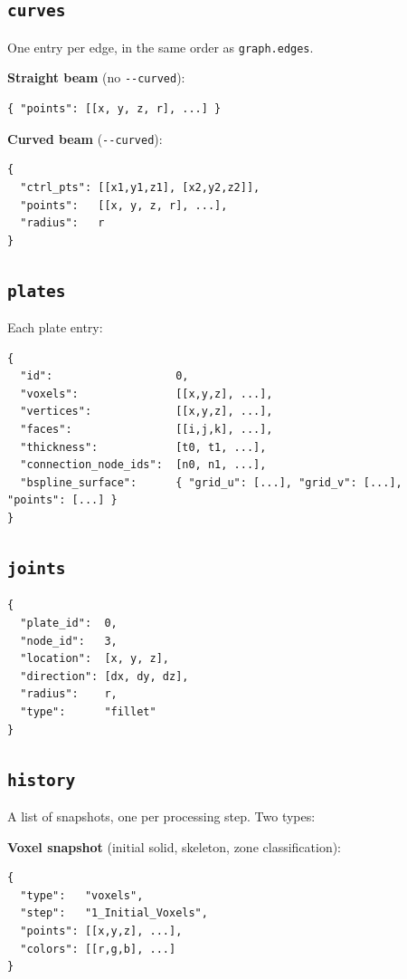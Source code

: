 \documentclass[a4paper, 11pt, openany]{report}
\begin{document}
\subsection{\texttt{curves}}

One entry per edge, in the same order as \texttt{graph.edges}.

\textbf{Straight beam} (no \texttt{-{}-curved}):
\begin{lstlisting}[style=textstyle]
{ "points": [[x, y, z, r], ...] }
\end{lstlisting}

\textbf{Curved beam} (\texttt{-{}-curved}):
\begin{lstlisting}[style=textstyle]
{
  "ctrl_pts": [[x1,y1,z1], [x2,y2,z2]],
  "points":   [[x, y, z, r], ...],
  "radius":   r
}
\end{lstlisting}


\subsection{\texttt{plates}}

Each plate entry:
\begin{lstlisting}[style=textstyle]
{
  "id":                   0,
  "voxels":               [[x,y,z], ...],
  "vertices":             [[x,y,z], ...],
  "faces":                [[i,j,k], ...],
  "thickness":            [t0, t1, ...],
  "connection_node_ids":  [n0, n1, ...],
  "bspline_surface":      { "grid_u": [...], "grid_v": [...], "points": [...] }
}
\end{lstlisting}


\subsection{\texttt{joints}}

\begin{lstlisting}[style=textstyle]
{
  "plate_id":  0,
  "node_id":   3,
  "location":  [x, y, z],
  "direction": [dx, dy, dz],
  "radius":    r,
  "type":      "fillet"
}
\end{lstlisting}


\subsection{\texttt{history}}

A list of snapshots, one per processing step.  Two types:

\textbf{Voxel snapshot} (initial solid, skeleton, zone classification):
\begin{lstlisting}[style=textstyle]
{
  "type":   "voxels",
  "step":   "1_Initial_Voxels",
  "points": [[x,y,z], ...],
  "colors": [[r,g,b], ...]
}
\end{lstlisting}
\end{document}
